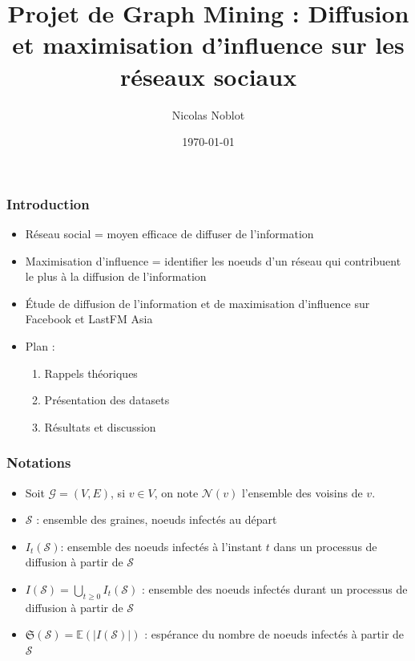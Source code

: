 \documentclass[11pt]{beamer}
\title{Projet de Graph Mining : Diffusion et maximisation d'influence sur les réseaux sociaux}
\author{Nicolas Noblot}
\date{\today}
\begin{document}
	
	\begin{frame}
		\titlepage
	\end{frame}

	\begin{frame}
		\frametitle{Introduction}
		\begin{itemize}
			\item Réseau social = moyen efficace de diffuser de l'information
			\item Maximisation d'influence  = identifier les noeuds d'un réseau qui contribuent le plus à la diffusion de l'information
			\item \'Etude de diffusion de l'information et de maximisation d'influence sur Facebook et LastFM Asia
			\item Plan : 
			\begin{enumerate}
				\item Rappels théoriques
				\item Présentation des datasets
				\item Résultats et discussion
			\end{enumerate}
		\end{itemize}
	\end{frame}

	\begin{frame}
		\frametitle{Notations}
		\begin{itemize}
			\item{Soit $\mathcal{G} = (V,E)$, si $v\in V$, on note $\mathcal{N}(v)$ l'ensemble des voisins de $v$.}
			\item $\mathcal{S}$ : ensemble des graines, noeuds infectés au départ
			\item $I_t(\mathcal{S})$: ensemble des noeuds infectés à l'instant $t$ dans un processus de diffusion à partir de $\mathcal{S}$
			\item $I(\mathcal{S}) = \bigcup_{t \geq 0} I_t(\mathcal{S})$ :  ensemble des noeuds infectés durant un processus de diffusion à partir de $\mathcal{S}$
			\item{$\mathfrak{S}(\mathcal{S}) = \mathbb{E}(|I(\mathcal{S})|)$ :  espérance du nombre de noeuds infectés à partir de $\mathcal{S}$}
		\end{itemize}
	\end{frame}
\end{document}
